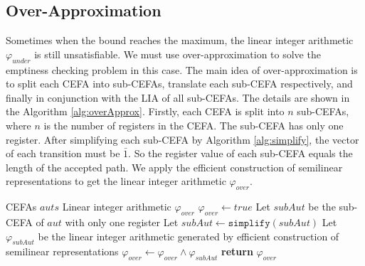 \documentclass[sigconf]{acmart}
\newcommand*{\myvec}[1]{\bar{#1}}
\newcommand*{\algfun}[1]{\texttt{#1}}
\begin{document}
\subsection{Over-Approximation}
Sometimes when the bound reaches the maximum, the linear integer arithmetic $\varphi_{under}$ is still unsatisfiable. We must use over-approximation to solve the emptiness checking problem in this case. The main idea of over-approximation is to split each CEFA into sub-CEFAs, translate each sub-CEFA respectively, and finally in conjunction with the LIA of all sub-CEFAs. The details are shown in the Algorithm \ref{alg:overApprox}. Firstly, each CEFA is split into $n$ sub-CEFAs, where $n$ is the number of registers in the CEFA. The sub-CEFA has only one register. After simplifying each sub-CEFA by Algorithm \ref{alg:simplify}, the vector of each transition must be $\myvec{1}$. So the register value of each sub-CEFA equals the length of the accepted path. We apply the efficient construction of semilinear representations\cite{unary_nfa_2010} to get the linear integer arithmetic $\varphi_{over}$.
\begin{algorithm}
  \caption{$\algfun{overApprox}(auts)$}
  \label{alg:overApprox}
  \begin{algorithmic}[1]
    \Require CEFAs $auts$
    \Ensure Linear integer arithmetic $\varphi_{over}$
    \Statex
    \State $\varphi_{over} \gets true$
      \State Let $subAut$ be the sub-CEFA of $aut$ with only one register
      \State Let $subAut \gets \algfun{simplify}(subAut)$
      \State Let $\varphi_{subAut}$ be the linear integer arithmetic generated by efficient construction of semilinear representations
      \State $\varphi_{over} \gets \varphi_{over} \wedge \varphi_{subAut}$
    \EndFor
    \State \textbf{return} $\varphi_{over}$
  \end{algorithmic}
\end{algorithm}
\end{document}
